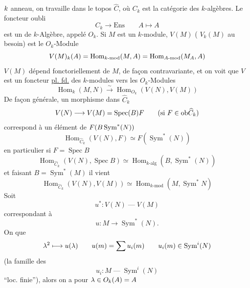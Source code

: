 
${k}$ anneau, on travaille dans le topos $\widehat C$, où $C_k$ est la catégorie des $k$-algèbres. Le foncteur oubli
\[
C_k\longrightarrow\mathrm{Ens}\qquad A\longmapsto A
\]
est un  de $k$-Algèbre, appelé $O_k$. Si $M$ est un $k$-module, $V(M)$ ( $V_k(M)$ au besoin) est le  $O_k$-Module
\[
V(M)_{{{k}}}({A})=\operatorname{Hom}_{k\text{-mod}}(M,A)=\operatorname{Hom}_{A\text{-mod}}(M_A,A)
\]
$V(M)$ dépend fonctoriellement de $M$, de façon contravariante, et on voit que $V$ est un foncteur \uline{pl. fd.} des $k$-modules vers les $O_k$-Modules
\[
\operatorname{Hom}_k(M,N)\xrightarrow{\sim}\operatorname{Hom}_{O_k}(V(N),V(M))
\]
 De façon générale, un morphisme dans $\widehat C_k$
\[
V(N)\longrightarrow{V(M)=\operatorname{Spec}(B)}F\qquad(\text{si }F\in\mathrm{ob}\widehat C_k)
\]
 correspond à un  élément de $F({{B}}\operatorname{Sym}^*(N))$
\[
\operatorname{Hom}_{\widehat C_k}(V(N),F)\simeq F(\operatorname{Sym}^*(N))
\]
en particulier si $F=\operatorname{Spec} B$
\[
\operatorname{Hom}_{\widehat C_k}(V(N),\operatorname{Spec}B)\simeq
\operatorname{Hom}_{k\text{-alg}}(B,\operatorname{Sym}^*(N))
\]
et faisant $B=\operatorname{Sym}^*(M)$ il vient
\[
\operatorname{Hom}_{\widehat C_k}(V(N),V(M))\simeq
\operatorname{Hom}_{k\text{-mod}}(M,\operatorname{Sym}^*N)
\]
Soit
\[
u^*:V(N)\mathbin{\text{---}}V(M)
\]
correspondant à
\[
u:M\longrightarrow\operatorname{Sym}^*(N).
\]
On  que
\[
{{\lambda^2\longmapsto u(\lambda)}}
\qquad u(m)=\sum u_i(m)\qquad u_i(m)\in\operatorname{Sym}^i(N)
\]
(la famille des  
\[
u_i:M\mathbin{\text{---}}\operatorname{Sym}^i(N)
\]
``loc. finie''), alors on a pour $\lambda\in{O_k}(A)=A$
